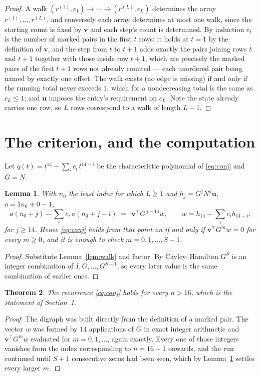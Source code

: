 \documentclass[11pt,a4paper]{article}
\theoremstyle{plain}
\newtheorem{theorem}{Theorem}
\newtheorem{lemma}[theorem]{Lemma}
\theoremstyle{definition}
\begin{document}
\begin{proof}
A walk $(r^{(1)},c_1)\to\cdots\to(r^{(L)},c_L)$ determines the array
$r^{(1)},\dots,r^{(L)}$, and conversely each array determines at most one walk, since the
starting count is fixed by $\mathbf{v}$ and each step's count is determined. By induction
$c_t$ is the number of marked pairs in the first $t$ rows: it holds at $t=1$ by the
definition of $\mathbf{v}$, and the step from $t$ to $t+1$ adds exactly the pairs joining
rows $t$ and $t+1$ together with those inside row $t+1$, which are precisely the marked
pairs of the first $t+1$ rows not already counted --- each unordered pair being named by
exactly one offset. The walk exists (no edge is missing) if and only if the running total
never exceeds $1$, which for a nondecreasing total is the same as $c_L\le1$; and
$\mathbf{u}$ imposes the entry's requirement on $c_L$. Note the state already carries one
row, so $L$ rows correspond to a walk of length $L-1$.
\end{proof}

\section{The criterion, and the computation}

Let $q(t)=t^{14}-\sum_i c_i\,t^{14-i}$ be the characteristic polynomial of
\eqref{eq:conj} and $G=N$.

\begin{lemma}\label{lem:crit}
With $n_0$ the least index for which $L\ge1$ and $h_j=G^{j}N^{o}\mathbf{u}$,
$o=1n_0+0-1$,
\[
a(n_0+j)-\sum_i c_i\,a(n_0+j-i)\;=\;\,\mathbf{v}^{\!\top}G^{\,j-14}w,
\qquad w=h_{14}-\sum_i c_i h_{14-i},
\]
for $j\ge14$. Hence \eqref{eq:conj} holds from that point on if and only if
$\mathbf{v}^{\!\top}G^{m}w=0$ for every $m\ge0$, and it is enough to check
$m=0,1,\dots,S-1$.
\end{lemma}

\begin{proof}
Substitute Lemma~\ref{lem:walk} and factor. By Cayley--Hamilton $G^{S}$ is an integer
combination of $I,G,\dots,G^{S-1}$, so every later value is the same combination of earlier
ones.
\end{proof}

\begin{theorem}
The recurrence \eqref{eq:conj} holds for every $n>16$, which is the statement of
Section~1.
\end{theorem}

\begin{proof}
The digraph was built directly from the definition of a marked pair. The vector $w$ was
formed by $14$ applications of $G$ in exact integer arithmetic and
$\mathbf{v}^{\!\top}G^{m}w$ evaluated for $m=0,1,\dots$, again exactly. Every one of
those integers vanishes from the index corresponding to $n=16+1$ onwards, and the run
continued until $S+1$ consecutive zeros had been seen, which by Lemma~\ref{lem:crit}
settles every larger $m$.
\end{proof}
\end{document}
